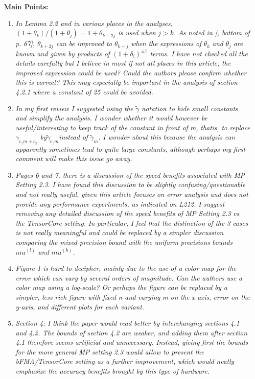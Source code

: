 \documentclass[final,onefignum,onetabnum]{siamart190516}
\begin{document}
\textbf{Main Points:}
\begin{enumerate}
    \item {\it In Lemma 2.2 and in various places in the analyses, $(1+\theta_{k})/(1+\theta_{j}) = 1+\theta_{k+2j}$ is used when $j > k$. As noted in [\cite{Higham2002}, bottom of p. 67], $\theta_{k+2j}$ can be improved to $\theta_{k+j}$ when the expressions of $\theta_{k}$ and $\theta_{j}$ are known and given by products of $(1 + \delta_i)^{\pm 1}$ terms. I have not checked all the details carefully but I believe in most if not all places in this article, the improved expression could be used? Could the authors please confirm whether this is correct? This may especially be important in the analysis of section 4.2.1 where a constant of 25 could be avoided.}
    \item {\it In my first review I suggested using the $\tilde{\gamma}$  notation to hide small constants and simplify the analysis. I wonder whether it would however be useful/interesting to keep track of the constant in front of m, thatis, to replace $\gamma_{c_1m+c_2}$ by$\tilde{\gamma}_{c_1m}$instead of $\tilde{\gamma}_{m}$. I wonder about this because the analysis can apparently sometimes lead to quite large constants, although perhaps my first comment will make this issue go away.}
    \item {\it Pages 6 and 7, there is a discussion of the speed benefits associated with MP Setting 2.3. I have found this discussion to be slightly confusing/questionable and not really useful, given this article focuses on error analysis and does not provide any performance experiments, as indicated on L212. I suggest removing any detailed discussion of the speed benefits of MP Setting 2.3 vs the TensorCore setting. In particular, I feel that the distinction of the 3 cases is not really meaningful and could be replaced by a simpler discussion comparing the mixed-precision bound with the uniform precisions bounds $mu^{(l)}$ and $mu^{(h)}$.}
    \item {\it Figure 1 is hard to decipher, mainly due to the use of a color map for the error which can vary by several orders of magnitude. Can the authors use a color map using a log-scale? Or perhaps the figure can be replaced by a simpler, less rich figure with fixed n and varying m on the x-axis, error on the y-axis, and different plots for each variant.}
    \item {\it Section 4: I think the paper would read better by interchanging sections 4.1 and 4.2. The bounds of section 4.2 are weaker, and adding them after section 4.1 therefore seems artificial and unnecessary. Instead, giving first the bounds for the more general MP setting 2.3 would allow to present the bFMA/TensorCore setting as a further improvement, which would neatly emphasize the accuracy benefits brought by this type of hardware.}

\end{enumerate}
\end{document}

